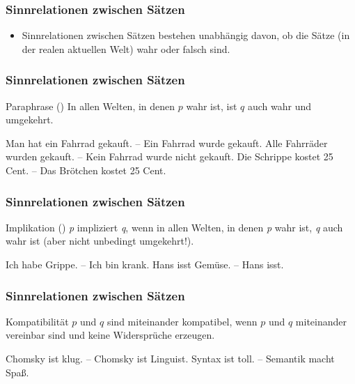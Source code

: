 \begin{frame}
\frametitle{Sinnrelationen zwischen Sätzen}

\begin{itemize}
	\item Sinnrelationen zwischen Sätzen bestehen unabhängig davon, ob die Sätze (in der realen aktuellen Welt) wahr oder falsch sind.
\end{itemize}

\end{frame}


\begin{frame}
\frametitle{Sinnrelationen zwischen Sätzen}

\begin{block}{Paraphrase ()}
In allen Welten, in denen $p$ wahr ist, ist $q$ auch wahr und umgekehrt.
\end{block}


	\eal 
		\ex Man hat ein Fahrrad gekauft. -- Ein Fahrrad wurde gekauft.
		\ex Alle Fahrräder wurden gekauft. -- Kein Fahrrad wurde nicht gekauft.
		\ex Die Schrippe kostet 25 Cent. -- Das Brötchen kostet 25 Cent.
	\zl
		
\end{frame}


\begin{frame}
\frametitle{Sinnrelationen zwischen Sätzen}

\begin{block}{Implikation ()}
\textit{p} impliziert \textit{q}, wenn in allen Welten, in denen \textit{p} wahr ist, \textit{q} auch wahr ist (aber nicht unbedingt umgekehrt!).
\end{block}
		
\eal 
	\ex Ich habe Grippe. -- Ich bin krank.
	\ex Hans isst Gemüse. -- Hans isst.
\zl

\end{frame}


\begin{frame}
\frametitle{Sinnrelationen zwischen Sätzen}

\begin{block}{Kompatibilität}
$p$ und $q$ sind miteinander kompatibel, wenn $p$ und $q$ miteinander vereinbar sind und keine Widersprüche erzeugen.
\end{block}

		\eal 
			\ex Chomsky ist klug. -- Chomsky ist Linguist.
			\ex Syntax ist toll. -- Semantik macht Spa\ss{}.
		\zl
		
\end{frame}


